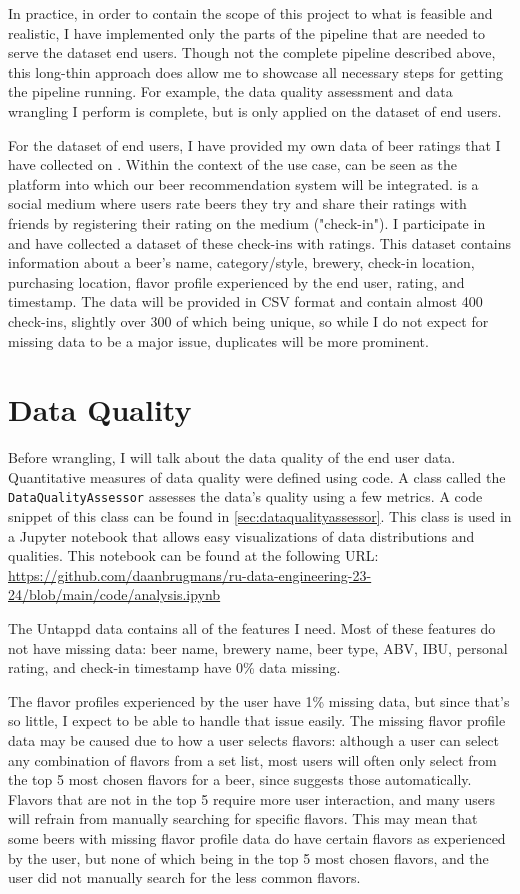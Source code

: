 \documentclass[sigconf]{acmart}
\begin{document}
In practice, in order to contain the scope of this project to what is feasible and realistic, I have implemented only the parts of the pipeline that are needed to serve the dataset end users.
Though not the complete pipeline described above, this long-thin approach does allow me to showcase all necessary steps for getting the pipeline running.
For example, the data quality assessment and data wrangling I perform is complete, but is only applied on the dataset of end users.

For the dataset of end users, I have provided my own data of beer ratings that I have collected on \citeauthor{untappd}.
Within the context of the use case, \citeauthor{untappd} can be seen as the platform into which our beer recommendation system will be integrated.
\citet{untappd} is a social medium where users rate beers they try and share their ratings with friends by registering their rating on the medium ("check-in").
I participate in \citeauthor{untappd} and have collected a dataset of these check-ins with ratings.
This dataset contains information about a beer's name, category/style, brewery, check-in location, purchasing location, flavor profile experienced by the end user, rating, and timestamp.
The data will be provided in CSV format and contain almost 400 check-ins, slightly over 300 of which being unique, so while I do not expect for missing data to be a major issue, duplicates will be more prominent.

\section{Data Quality}
Before wrangling, I will talk about the data quality of the end user data.
Quantitative measures of data quality were defined using code.
A class called the \texttt{DataQualityAssessor} assesses the data's quality using a few metrics.
A code snippet of this class can be found in \ref{sec:dataqualityassessor}.
This class is used in a Jupyter notebook that allows easy visualizations of data distributions and qualities.
This notebook can be found at the following URL: \url{https://github.com/daanbrugmans/ru-data-engineering-23-24/blob/main/code/analysis.ipynb}

The Untappd data contains all of the features I need.
Most of these features do not have missing data: beer name, brewery name, beer type, ABV, IBU, personal rating, and check-in timestamp have 0\% data missing.

The flavor profiles experienced by the user have 1\% missing data, but since that's so little, I expect to be able to handle that issue easily.
The missing flavor profile data may be caused due to how a user selects flavors: although a user can select any combination of flavors from a set list, most users will often only select from the top 5 most chosen flavors for a beer, since \citeauthor{untappd} suggests those automatically.
Flavors that are not in the top 5 require more user interaction, and many users will refrain from manually searching for specific flavors.
This may mean that some beers with missing flavor profile data do have certain flavors as experienced by the user, but none of which being in the top 5 most chosen flavors, and the user did not manually search for the less common flavors.
\end{document}
